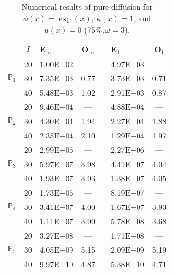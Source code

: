 \begin{table}[H]
\centering
\caption{Numerical results of pure diffusion for $\phi(x)=\exp(x)$, $\kappa(x)=1$, and $u(x)=0$ ($75\%,\omega=3$).}
\begin{tabular}{@{}l c l c c l c@{}}
\toprule
 & $I$ & E$_{\infty}$ & O$_{\infty}$ && E$_1$ & O$_1$\\
\midrule
\multirow{3}{*}{$\mathbb{P}_{1}$}
 & 20 & 1.00E$-$02 & --- && 4.97E$-$03 & ---\\
 & 30 & 7.35E$-$03 & 0.77 && 3.73E$-$03 & 0.71\\
 & 40 & 5.48E$-$03 & 1.02 && 2.91E$-$03 & 0.87\\
\midrule
\multirow{3}{*}{$\mathbb{P}_{2}$}
 & 20 & 9.46E$-$04 & --- && 4.88E$-$04 & ---\\
 & 30 & 4.30E$-$04 & 1.94 && 2.27E$-$04 & 1.88\\
 & 40 & 2.35E$-$04 & 2.10 && 1.29E$-$04 & 1.97\\
\midrule
\multirow{3}{*}{$\mathbb{P}_{3}$}
 & 20 & 2.99E$-$06 & --- && 2.27E$-$06 & ---\\
 & 30 & 5.97E$-$07 & 3.98 && 4.41E$-$07 & 4.04\\
 & 40 & 1.93E$-$07 & 3.93 && 1.38E$-$07 & 4.05\\
\midrule
\multirow{3}{*}{$\mathbb{P}_{4}$}
 & 20 & 1.73E$-$06 & --- && 8.19E$-$07 & ---\\
 & 30 & 3.41E$-$07 & 4.00 && 1.67E$-$07 & 3.93\\
 & 40 & 1.11E$-$07 & 3.90 && 5.78E$-$08 & 3.68\\
\midrule
\multirow{3}{*}{$\mathbb{P}_{5}$}
 & 20 & 3.27E$-$08 & --- && 1.71E$-$08 & ---\\
 & 30 & 4.05E$-$09 & 5.15 && 2.09E$-$09 & 5.19\\
 & 40 & 9.97E$-$10 & 4.87 && 5.38E$-$10 & 4.71\\
\bottomrule
\end{tabular}
\end{table}